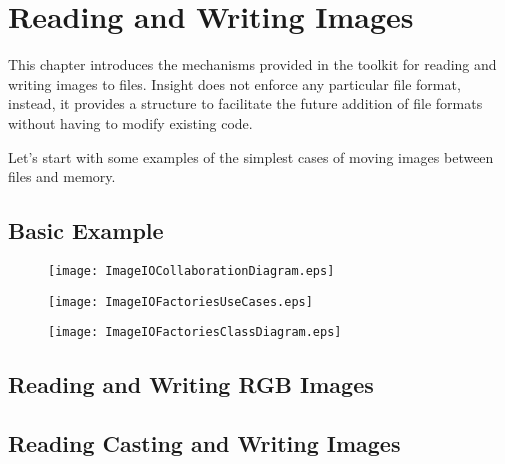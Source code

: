 

\chapter{Reading and Writing Images}
\label{sec:IO}

This chapter introduces the mechanisms provided in the toolkit for reading and
writing images to files. Insight does not enforce any particular file format,
instead, it provides a structure to facilitate the future addition of file
formats without having to modify existing code. 

Let's start with some examples of the simplest cases of moving images between files
and memory.

\section{Basic Example}
\label{sec:ImagReadWrite}



\begin{figure}
\center
\texttt{[image: ImageIOCollaborationDiagram.eps]}
 \label{fig:ImageIOCollaborationDiagram}
\end{figure}

\begin{figure}
\center
\texttt{[image: ImageIOFactoriesUseCases.eps]}
\label{fig:ImageIOFactoriesUseCases}
\end{figure}

\begin{figure}
\center
\texttt{[image: ImageIOFactoriesClassDiagram.eps]}
\label{fig:ImageIOFactoriesClassDiagram}
\end{figure}

\section{Reading and Writing RGB Images}
\label{sec:RGBImagReadWrite}


\section{Reading Casting and Writing Images}
\label{sec:ImagReadCastWrite}


